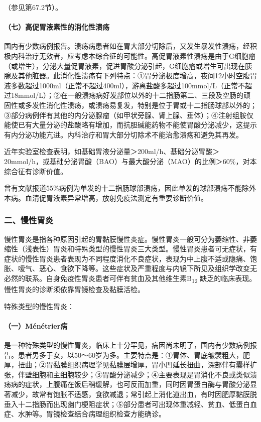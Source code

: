 （参见第67.2节）。

\paragraph{（七）高促胃液素性的消化性溃疡}

国内有少数病例报告。溃疡病患者如在胃大部分切除后，又发生暴发性溃疡，经积极内科治疗无效者，应考虑本综合征的可能性。高促胃液素性溃疡是由于G细胞瘤（或增生），分泌大量促胃液素，促进胃酸分泌引起，G细胞瘤或增生可出现在胰腺及其他脏器。此消化性溃疡有下列特点：①胃分泌极度增高，夜间12小时空腹胃液多数超过1000ml（正常不超过400ml），游离盐酸多超过100mmol/L（正常不超过18mmol/L）；②在一般溃疡病好发部位以外的十二指肠第二、三段及空肠的顽固性或多发性消化性溃疡，或溃疡易复发，特别是位于胃或十二指肠球部以外的；③部分病例伴有其他的内分泌腺瘤（如甲状旁腺、肾上腺、垂体）；④注射组胺仅能使已有大量分泌的盐酸略有增加，而抗胆碱能药物不能使胃酸分泌减少，这提示有内分泌功能亢进。内科治疗和胃大部分切除术不能治愈溃疡和避免其再发。

近年实验室检查表明，如基础胃液分泌量＞200ml/h、基础分泌胃酸＞20mmol/h，或基础分泌胃酸（BAO）与最大酸分泌（MAO）的比例＞60\%，对本综合征有诊断价值。

曾有文献报道55\%病例为单发的十二指肠球部溃疡，因此单发的球部溃疡不能除外本病。血清促胃液素异常增高，放射免疫法测定有重要诊断价值。

\subsubsection{二、慢性胃炎}

慢性胃炎是指各种原因引起的胃黏膜慢性炎症。慢性胃炎一般可分为萎缩性、非萎缩性（浅表性）胃炎和特殊类型的慢性胃炎三大类型。慢性胃炎患者可无症状，有症状的慢性胃炎患者表现为不同程度消化不良症状，表现为中上腹不适或隐痛、饱胀、嗳气、恶心、食欲下降等。这些症状及严重程度与内镜下所见及组织学改变无必然的联系。自身免疫性胃炎患者可伴有贫血及其他维生素B\textsubscript{12}
缺乏的临床表现。慢性胃炎的诊断须依靠胃镜检查及黏膜活检。

特殊类型的慢性胃炎：

\paragraph{（一）Ménétrier病}

是一种特殊类型的慢性胃炎，临床上十分罕见，病因尚未明了，国内有少数病例报告。患者男多于女，以50～60岁为多。主要特点是：①胃体、胃底皱襞粗大，肥厚，扭曲；②胃黏膜组织病理学见黏膜层增厚，胃小凹延长扭曲，深部伴有囊样扩张，伴壁细胞和主细胞较少；③胃酸分泌减少；④主要表现是胃消化不良或类似溃疡病的症状，上腹痛在饭后稍缓解，也可反而加重，同时因胃蛋白酶与胃酸分泌显著减少，故常有饱胀不适感，食欲减退；常引起上消化道出血，有时因肥厚黏膜脱垂入十二指肠而出现幽门梗阻症状；⑤部分患者可出现体重减轻、贫血、低蛋白血症、水肿等。胃镜检查结合病理组织检查方能确诊。

